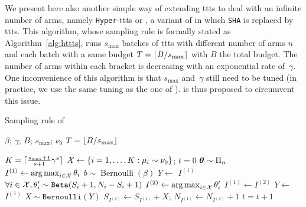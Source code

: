 We present here also another simple way of extending \gls{ttts} to deal with an infinite number of arms, namely \texttt{Hyper}-\gls{ttts} or \HTTTS, a variant of \Hyperband in which \texttt{SHA} is replaced by \gls{ttts}. This algorithm, whose sampling rule is formally stated as Algorithm~\ref{alg:httts}, runs $s_{\max}$ batches of \gls{ttts} with different number of arms $n$ and each batch with a same budget $T=\lceil B/s_{\max}\rceil$ with $B$ the total budget. The number of arms within each bracket is decreasing with an exponential rate of~$\gamma$. One inconvenience of this algorithm is that $s_{\max}$ and~$\gamma$ still need to be tuned (in practice, we use the same tuning as the one of \Hyperband). \DTTTS is thus proposed to circumvent this issue. 

\begin{algorithm}[ht]
\centering
\caption{Sampling rule of \HTTTS{}}
\label{alg:httts}
\begin{algorithmic}[1] %
     $\beta$; $\gamma$; $B$; $s_{\operatorname{max}}$; $\nu_0$
     $T=\lfloor B/s_{\operatorname{max}}\rfloor$

    	\State $K = \lceil\frac{s_{\operatorname{max}}+1}{s+1}\gamma^s\rceil$
    	\State $\mathcal{X} \leftarrow \{i=1,\ldots,K: \mu_i\sim\nu_0\}$; $t=0$
    		\State {} ${\boldsymbol \theta} \sim \Pi_n$
            \State $I^{(1)} \leftarrow \operatorname*{arg\,max}_{i\in\mathcal{X}}\theta_i$
    	    \State {} $b \sim \operatorname{Bernoulli}(\beta)$
    	        \State $Y \leftarrow$  $I^{(1)}$
    	    \Else
    	            \State $\forall i\in\mathcal{X}, \theta_i' \sim \texttt{Beta}(S_i+1,N_i-S_i+1)$
    	            \State $I^{(2)} \leftarrow \operatorname*{arg\,max}_{i \in \mathcal{X}}\theta_i'$ 
    	        \EndWhile
    	        \State $I^{(1)} \gets I^{(2)}$
    		    \State $Y \leftarrow$  $I^{(1)}$
    	    \EndIf
    	    \State $X \sim \texttt{Bernoulli}(Y)$ 
    	    \State $S_{I^{(1)}} \gets S_{I^{(1)}} + X$; $N_{I^{(1)}} \gets N_{I^{(1)}} + 1$
    		\State $t = t+1$
        \EndWhile
    \EndFor
\end{algorithmic}
\end{algorithm}

